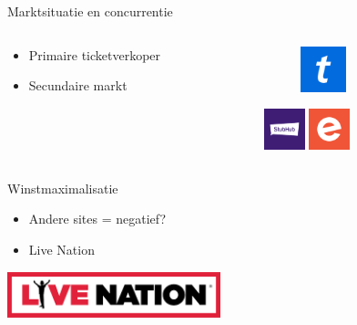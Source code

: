 \documentclass{beamer}
\begin{document}
\begin{frame}{Marktsituatie en concurrentie}
    \begin{columns}
        \begin{column}{.4\textwidth}
            \begin{itemize}
                \item Primaire ticketverkoper
                \item Secundaire markt
            \end{itemize}
        \end{column}
        \begin{column}{.6\textwidth}
            \begin{figure}
                \includegraphics[width=50px,height=50px,keepaspectratio]{ticketmaster-logo.png}
            \end{figure}
            \centering
            \includegraphics[width=45px,height=45px,keepaspectratio]{stubhub-logo.png}
            \includegraphics[width=45px,height=45px,keepaspectratio]{eventbrite-logo.png}
        \end{column}
    \end{columns}
\end{frame}


\begin{frame}{Winstmaximalisatie}
    \begin{itemize}
        \item Andere sites = negatief?
        \item Live Nation
    \end{itemize}
    \begin{center}
        \includegraphics[height=50px, keepaspectratio]{livenation_logo.png}
    \end{center}
\end{frame}
\end{document}
